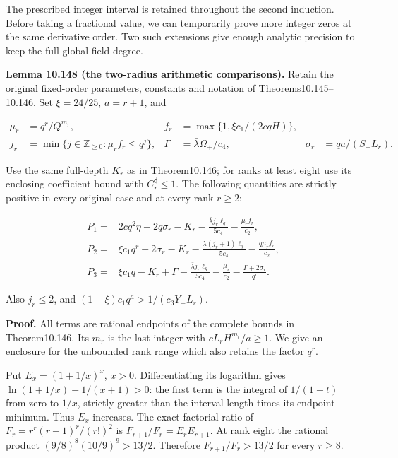 \documentclass[
  11pt,
  a4paper,
]{article}
\begin{document}
The prescribed integer interval is retained throughout the second
induction. Before taking a fractional value, we can temporarily prove
more integer zeros at the same derivative order. Two such extensions
give enough analytic precision to keep the full global field degree.

\textbf{Lemma 10.148 (the two-radius arithmetic comparisons).} Retain
the original fixed-order parameters, constants and notation of
Theorems10.145--10.146. Set \(\xi=24/25\), \(a=r+1\), and

\[
\begin{aligned}
\mu_r&=q^r/Q^{m_r},&
f_r&=\max\{1,\xi c_1/(2cqH)\},\\
j_r&=\min\{j\in\mathbb Z_{\ge0}:\mu_rf_r\le q^j\},&
\Gamma&=\bar\lambda\Omega_+/c_4,&
\sigma_r&=qa/(S_-L_r).
\end{aligned}
\tag{10.433}
\]

Use the same full-depth \(K_r\) as in Theorem10.146; for ranks at least
eight use its enclosing coefficient bound with \(C_r^\sharp\le1\). The
following quantities are strictly positive in every original case and at
every rank \(r\ge2\):

\[
\begin{aligned}
P_1={}&2cq^2\eta-2q\sigma_r
 -K_r-\frac{\bar\lambda j_r\ell_q}{5c_4}
 -\frac{\mu_rf_r}{c_2},\\
P_2={}&\xi c_1q^r-2\sigma_r
 -K_r-\frac{\bar\lambda(j_r+1)\ell_q}{5c_4}
 -\frac{q\mu_rf_r}{c_2},\\
P_3={}&\xi c_1q-K_r+\Gamma
 -\frac{\bar\lambda j_r\ell_q}{5c_4}
 -\frac{\mu_r}{c_2}
 -\frac{\Gamma+2\sigma_r}{q^r}.
\end{aligned}
\tag{10.434}
\]

Also \(j_r\le2\), and \((1-\xi)c_1q^a>1/(c_3Y_-L_r)\).

\textbf{Proof.} All terms are rational endpoints of the complete bounds
in Theorem10.146. Its \(m_r\) is the last integer with
\(cL_rH^{m_r}/a\ge1\). We give an enclosure for the unbounded rank range
which also retains the factor \(q^r\).

Put \(E_x=(1+1/x)^x\), \(x>0\). Differentiating its logarithm gives
\(\ln(1+1/x)-1/(x+1)>0\): the first term is the integral of \(1/(1+t)\)
from zero to \(1/x\), strictly greater than the interval length times
its endpoint minimum. Thus \(E_x\) increases. The exact factorial ratio
of \(F_r=r^r(r+1)^r/(r!)^2\) is \(F_{r+1}/F_r=E_rE_{r+1}\). At rank
eight the rational product \((9/8)^8(10/9)^9>13/2\). Therefore
\(F_{r+1}/F_r>13/2\) for every \(r\ge8\).
\end{document}
